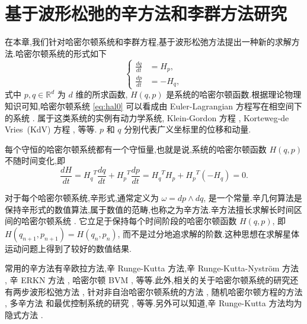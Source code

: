 \chapter{基于波形松弛的辛方法和李群方法研究}

在本章,我们针对哈密尔顿系统和李群方程,基于波形松弛方法提出一种新的求解方法.哈密尔顿系统的形式如下
\begin{equation}\label{eq:hal0}
  \left\lbrace
    \begin{aligned}
      \frac{dq}{dt}&=H_p,\\
      \frac{dp}{dt}&=-H_q,
    \end{aligned}
  \right.
\end{equation}
式中 $p,q \in \mathbb{R}^d$ 为 $d$ 维的所求函数, $H(q,p)$ 是系统的哈密尔顿函数.根据理论物理知识可知,哈密尔顿系统 \eqref{eq:hal0} 可以看成由 Euler-Lagrangian 方程写在相空间下的系统 \cite{frankel2011geometry}. 属于这类系统的实例有动力学系统, Klein-Gordon 方程 \cite{nakanishi2011global}, Korteweg-de Vries~(KdV) 方程 \cite{abdalla2012three}, 等等. $p$ 和 $q$ 分别代表广义坐标里的位移和动量.

每个守恒的哈密尔顿系统都有一个守恒量,也就是说,系统的哈密尔顿函数 $H(q,p)$ 不随时间变化,即
\begin{equation*}
  \frac{dH}{dt}={H_q}^T\frac{dq}{dt}+{H_p}^T\frac{dp}{dt}={H_q}^TH_p+{H_p}^T(-H_q)=0.
\end{equation*}

对于每个哈密尔顿系统,辛形式,通常定义为 $\omega = dp \wedge dq$, 是一个常量.辛几何算法是保持辛形式的数值算法,属于数值的范畴,也称之为辛方法.辛方法擅长求解长时间区间的哈密尔顿系统 \cite{feng2010symplectic,hairer2006geometric}. 它立足于保持每个时间阶段的哈密尔顿函数  $H(q,p)$, 即 $H(q_{n+1},p_{n+1})=H(q_n,p_n)$, 而不是过分地追求解的阶数.这种思想在求解星体运动问题上得到了较好的数值结果.

常用的辛方法有辛欧拉方法,辛 Runge-Kutta 方法,辛 Runge-Kutta-Nystr{\"o}m 方法 \cite{kalogiratou2014fourth,kalogiratou2015}, 辛 ERKN 方法 \cite{wang2014ahigh}, 哈密尔顿 BVM \cite{brugnano2014multi}, 等等.此外,相关的关于哈密尔顿系统的研究还有两步波形松弛方法 \cite{hassanzadeh2014two}, 针对非自治哈密尔顿系统的方法 \cite{hong2000numerical,zhang2010anote}, 随机哈密尔顿方程的方法 \cite{burrage2014structure,ma2015sto,fan2015using}, 多辛方法 \cite{wang2013multi} 和最优控制系统的研究 \cite{li2015asym}, 等等.另外可以知道,辛 Runge-Kutta 方法均为隐式方法 \cite{sanz1988runge}.

